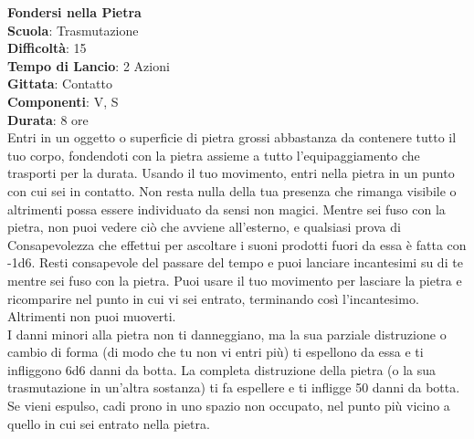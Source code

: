 \begin{multicols}{2}
\medskip\textbf{Fondersi nella Pietra}\\
\textbf{Scuola}: Trasmutazione\\
\textbf{Difficoltà}:  15\\
\textbf{Tempo di Lancio}: 2 Azioni\\
\textbf{Gittata}: Contatto\\
\textbf{Componenti}: V, S\\
\textbf{Durata}: 8 ore\\
Entri in un oggetto o superficie di pietra grossi abbastanza da contenere tutto il tuo corpo, fondendoti con la pietra assieme a tutto l’equipaggiamento che trasporti per la durata. Usando il tuo movimento, entri nella pietra in un punto con cui sei in contatto. Non resta nulla della tua presenza che rimanga visibile o altrimenti possa essere individuato da sensi non magici. Mentre sei fuso con la pietra, non puoi vedere ciò che avviene all'esterno, e qualsiasi prova di Consapevolezza che effettui per ascoltare i suoni prodotti fuori da essa è fatta con -1d6. Resti consapevole del passare del tempo e puoi lanciare incantesimi su di te mentre sei fuso con la pietra. Puoi usare il tuo movimento per lasciare la pietra e ricomparire nel punto in cui vi sei entrato, terminando così l'incantesimo. Altrimenti non puoi muoverti.\\
I danni minori alla pietra non ti danneggiano, ma la sua parziale distruzione o cambio di forma (di modo che tu non vi entri più) ti espellono da essa e ti infliggono 6d6 danni da botta. La completa distruzione della pietra (o la sua trasmutazione in un'altra sostanza) ti fa espellere e ti infligge 50 danni da botta. Se vieni espulso, cadi prono in uno spazio non occupato, nel punto più vicino a quello in cui sei entrato nella pietra.


\end{multicols}
